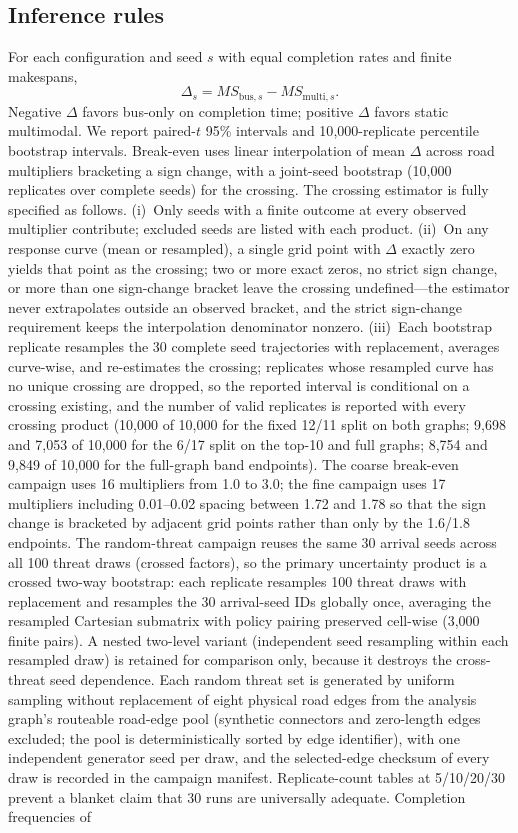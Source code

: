 \documentclass{ieeeaccess}
\begin{document}
\subsection{Inference rules}
For each configuration and seed $s$ with equal completion rates and finite makespans,
\begin{equation}
\Delta_s = MS_{\mathrm{bus},s} - MS_{\mathrm{multi},s}.
\label{eq:delta}
\end{equation}
Negative $\Delta$ favors bus-only on completion time; positive $\Delta$ favors static multimodal. We report paired-$t$ 95\% intervals and 10{,}000-replicate percentile bootstrap intervals. Break-even uses linear interpolation of mean $\Delta$ across road multipliers bracketing a sign change, with a joint-seed bootstrap (10{,}000 replicates over complete seeds) for the crossing. The crossing estimator is fully specified as follows. (i)~Only seeds with a finite outcome at every observed multiplier contribute; excluded seeds are listed with each product. (ii)~On any response curve (mean or resampled), a single grid point with $\Delta$ exactly zero yields that point as the crossing; two or more exact zeros, no strict sign change, or more than one sign-change bracket leave the crossing undefined---the estimator never extrapolates outside an observed bracket, and the strict sign-change requirement keeps the interpolation denominator nonzero. (iii)~Each bootstrap replicate resamples the 30 complete seed trajectories with replacement, averages curve-wise, and re-estimates the crossing; replicates whose resampled curve has no unique crossing are dropped, so the reported interval is conditional on a crossing existing, and the number of valid replicates is reported with every crossing product (10{,}000 of 10{,}000 for the fixed 12/11 split on both graphs; 9{,}698 and 7{,}053 of 10{,}000 for the 6/17 split on the top-10 and full graphs; 8{,}754 and 9{,}849 of 10{,}000 for the full-graph band endpoints). The coarse break-even campaign uses 16 multipliers from 1.0 to 3.0; the fine campaign uses 17 multipliers including 0.01--0.02 spacing between 1.72 and 1.78 so that the sign change is bracketed by adjacent grid points rather than only by the 1.6/1.8 endpoints. The random-threat campaign reuses the same 30 arrival seeds across all 100 threat draws (crossed factors), so the primary uncertainty product is a crossed two-way bootstrap: each replicate resamples 100 threat draws with replacement and resamples the 30 arrival-seed IDs globally once, averaging the resampled Cartesian submatrix with policy pairing preserved cell-wise (3{,}000 finite pairs). A nested two-level variant (independent seed resampling within each resampled draw) is retained for comparison only, because it destroys the cross-threat seed dependence. Each random threat set is generated by uniform sampling without replacement of eight physical road edges from the analysis graph's routeable road-edge pool (synthetic connectors and zero-length edges excluded; the pool is deterministically sorted by edge identifier), with one independent generator seed per draw, and the selected-edge checksum of every draw is recorded in the campaign manifest. Replicate-count tables at 5/10/20/30 prevent a blanket claim that 30 runs are universally adequate. Completion frequencies of 
\end{document}
